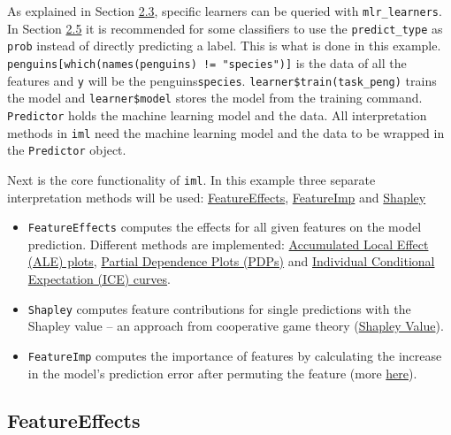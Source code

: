 \documentclass[
]{scrbook}
\begin{document}
As explained in Section \href{https://mlr3book.mlr-org.com/learners.html}{2.3}, specific learners can be queried with \texttt{mlr\_learners}.
In Section \href{https://mlr3book.mlr-org.com/train-predict.html}{2.5} it is recommended for some classifiers to use the \texttt{predict\_type} as \texttt{prob} instead of directly predicting a label.
This is what is done in this example.
\texttt{penguins{[}which(names(penguins)\ !=\ "species"){]}} is the data of all the features and \texttt{y} will be the penguins\texttt{species}.
\texttt{learner\$train(task\_peng)} trains the model and \texttt{learner\$model} stores the model from the training command.
\texttt{Predictor} holds the machine learning model and the data.
All interpretation methods in \texttt{iml} need the machine learning model and the data to be wrapped in the \texttt{Predictor} object.

Next is the core functionality of \texttt{iml}. In this example three separate interpretation methods will be used: \href{https://github.com/christophM/iml/blob/master/R/FeatureEffects.R}{FeatureEffects}, \href{https://github.com/christophM/iml/blob/master/R/FeatureImp.R}{FeatureImp} and \href{https://github.com/christophM/iml/blob/master/R/Shapley.R}{Shapley}

\begin{itemize}
\item
  \texttt{FeatureEffects} computes the effects for all given features on the model prediction. Different methods are implemented: \href{https://christophm.github.io/interpretable-ml-book/ale.html}{Accumulated Local Effect (ALE) plots}, \href{https://christophm.github.io/interpretable-ml-book/pdp.html}{Partial Dependence Plots (PDPs)} and \href{https://christophm.github.io/interpretable-ml-book/ice.html}{Individual Conditional Expectation (ICE) curves}.
\item
  \texttt{Shapley} computes feature contributions for single predictions with the Shapley value -- an approach from cooperative game theory (\href{https://christophm.github.io/interpretable-ml-book/shapley.html}{Shapley Value}).
\item
  \texttt{FeatureImp} computes the importance of features by calculating the increase in the model's prediction error after permuting the feature (more \href{https://christophm.github.io/interpretable-ml-book/feature-importance.html\#feature-importance}{here}).
\end{itemize}

\hypertarget{featureeffects}{%
\subsection{FeatureEffects}\label{featureeffects}}
\end{document}
